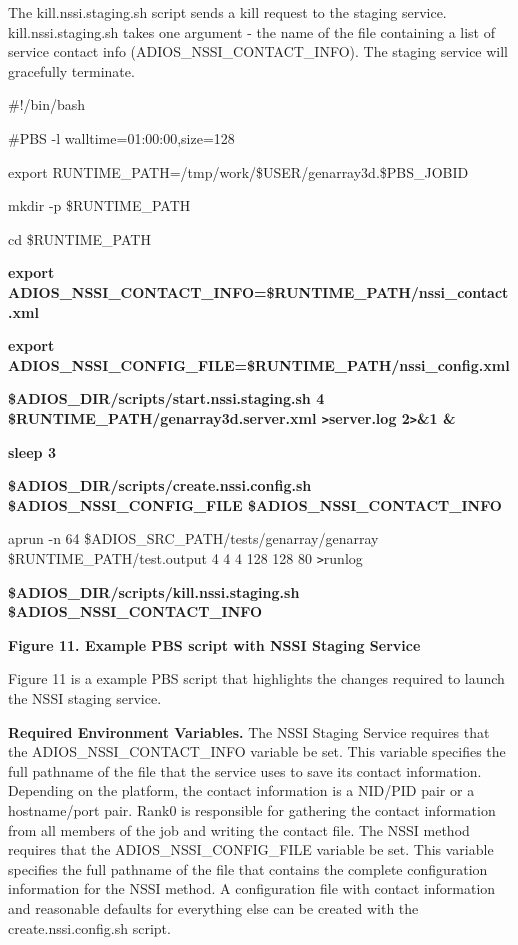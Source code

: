 The kill.nssi.staging.sh script sends a kill request to the staging service.  kill.nssi.staging.sh 
 takes one argument - the name of the file containing a list of service contact 
info (ADIOS\_NSSI\_CONTACT\_INFO).  The staging service will gracefully terminate.


{\small \#!/bin/bash}

{\small \#PBS -l walltime=01:00:00,size=128}

{\small export RUNTIME\_PATH=/tmp/work/\$USER/genarray3d.\$PBS\_JOBID}

{\small mkdir -p \$RUNTIME\_PATH}

{\small cd \$RUNTIME\_PATH}

{\small \textbf{export ADIOS\_NSSI\_CONTACT\_INFO=\$RUNTIME\_PATH/nssi\_contact.xml}}

{\small \textbf{export ADIOS\_NSSI\_CONFIG\_FILE=\$RUNTIME\_PATH/nssi\_config.xml}}

{\small \textbf{\$ADIOS\_DIR/scripts/start.nssi.staging.sh 4 \$RUNTIME\_PATH/genarray3d.server.xml 
\texttt{>}server.log 2\texttt{>}\&1 \&}}

{\small \textbf{sleep 3}}

{\small \textbf{\$ADIOS\_DIR/scripts/create.nssi.config.sh \$ADIOS\_NSSI\_CONFIG\_FILE 
\$ADIOS\_NSSI\_CONTACT\_INFO}}

{\small aprun -n 64 \$ADIOS\_SRC\_PATH/tests/genarray/genarray \$RUNTIME\_PATH/test.output 
4 4 4 128 128 80 \texttt{>}runlog}

{\small \textbf{\$ADIOS\_DIR/scripts/kill.nssi.staging.sh \$ADIOS\_NSSI\_CONTACT\_INFO}}

\label{HRef140733157}\label{HToc144350170}

\leftskip=18pt
{\color{color20} \textbf{Figure 11. Example PBS script with NSSI Staging Service}}

\leftskip=0pt
Figure 11 is a example PBS script that highlights the changes required to launch 
the NSSI staging service.

\textbf{Required Environment Variables.}  The NSSI Staging Service requires that 
the ADIOS\_NSSI\_CONTACT\_INFO variable be set.  This variable specifies the full 
pathname of the file that the service uses to save its contact information.  Depending 
on the platform, the contact information is a NID/PID pair or a hostname/port pair. 
 Rank0 is responsible for gathering the contact information from all members of 
the job and writing the contact file.  The NSSI method requires that the ADIOS\_NSSI\_CONFIG\_FILE 
variable be set.  This variable specifies the full pathname of the file that contains 
the complete configuration information for the NSSI method.  A configuration file 
with contact information and reasonable defaults for everything else can be created 
with the create.nssi.config.sh script.

